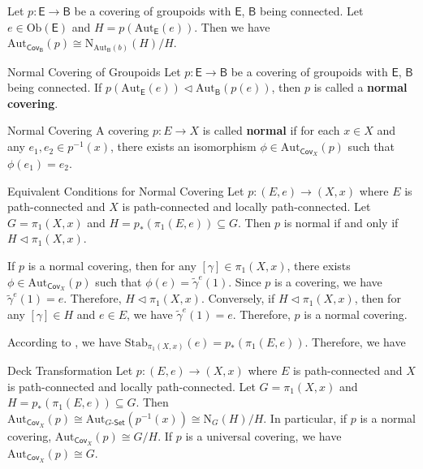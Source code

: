 \documentclass{report}
\begin{document}
\begin{proposition}{}{}
	Let $p:\mathsf{E}\to \mathsf{B}$ be a covering of groupoids with $\mathsf{E}$, $\mathsf{B}$ being connected. Let $e\in\mathrm{Ob}(\mathsf{E})$ and $H=p(\mathrm{Aut}_{\mathsf{E}}(e))$. Then we have $\mathrm{Aut}_{\mathsf{Cov}_\mathsf{B}}(p)\cong \mathrm{N}_{\mathrm{Aut}_{\mathsf{B}}(b)}(H)/H$.
\end{proposition}


\begin{definition}{Normal Covering of Groupoids}{}
	Let $p:\mathsf{E}\to \mathsf{B}$ be a covering of groupoids with $\mathsf{E}$, $\mathsf{B}$ being connected. If $p(\mathrm{Aut}_{\mathsf{E}}(e))\lhd \mathrm{Aut}_{\mathsf{B}}(p(e))$, then $p$ is called a \textbf{normal covering}.
\end{definition}



\begin{definition}{Normal Covering}{}
	A covering $p: E \rightarrow X$ is called \textbf{normal} if for each $x \in X$ and any $e_1,e_2\in p^{-1}(x)$, there exists an isomorphism $\phi\in \mathrm{Aut}_{\mathsf{Cov}_X}(p)$ such that $\phi(e_1)=e_2$.
\end{definition}

\begin{proposition}{Equivalent Conditions for Normal Covering}{}
	Let $p:\left(E, e\right) \rightarrow\left(X, x\right)$ where $E$ is path-connected and $X$ is path-connected and locally path-connected. Let $G=\pi_1\left(X, x\right)$ and $H=p_*\left(\pi_1\left(E,e\right)\right) \subseteq G$. Then $p$ is normal if and only if $H\lhd\pi_1\left(X, x\right)$.
\end{proposition}

\begin{prf}
	If $p$ is a normal covering, then for any $[\gamma]\in \pi_1\left(X, x\right)$, there exists $\phi\in \mathrm{Aut}_{\mathsf{Cov}_X}(p)$ such that $\phi(e)=\widetilde{\gamma}^e(1)$. Since $p$ is a covering, we have $\widetilde{\gamma}^e(1)=e$. Therefore, $H\lhd\pi_1\left(X, x\right)$. Conversely, if $H\lhd\pi_1\left(X, x\right)$, then for any $[\gamma]\in H$ and $e\in E$, we have $\widetilde{\gamma}^e(1)=e$. Therefore, $p$ is a normal covering. 
	
	
	According to , we have $\mathrm{Stab}_{\pi_1(X, x)}(e)=p_*(\pi_1(E, e))$. Therefore, we have
	
\end{prf}
\begin{proposition}{Deck Transformation}{}
	Let $p:\left(E, e\right) \rightarrow\left(X, x\right)$ where $E$ is path-connected and $X$ is path-connected and locally path-connected. Let $G=\pi_1\left(X, x\right)$ and $H=p_*\left(\pi_1\left(E,e\right)\right) \subseteq G$. Then $\mathrm{Aut}_{\mathsf{Cov}_X}(p)\cong\mathrm{Aut}_{G\text{-}\mathsf{Set}}(p^{-1}(x))\cong\mathrm{N}_{G}(H) / H$.
	In particular, if $p$ is a normal covering, $\mathrm{Aut}_{\mathsf{Cov}_X}(p)\cong G / H$. If $p$ is a universal covering, we have $\mathrm{Aut}_{\mathsf{Cov}_X}(p) \cong G$.
\end{proposition}
\end{document}
